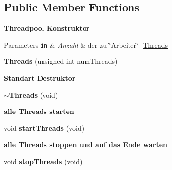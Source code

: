 \subsection*{Public Member Functions}
\begin{Indent}{\bf Threadpool Konstruktor}\par
{\em 
\begin{DoxyParams}[1]{Parameters}
\mbox{\tt in}  & {\em Anzahl} & der zu \char`\"{}\+Arbeiter\char`\"{}-\/ \hyperlink{classrc_1_1Threads}{Threads} \\
\hline
\end{DoxyParams}
}\begin{DoxyCompactItemize}
\item 
\hypertarget{classrc_1_1Threads_affe90c184a6b2df13bdeb7912b6aff5d}{{\bfseries Threads} (unsigned int num\+Threads)}\label{classrc_1_1Threads_affe90c184a6b2df13bdeb7912b6aff5d}

\end{DoxyCompactItemize}
\end{Indent}
\begin{Indent}{\bf Standart Destruktor}\par
\begin{DoxyCompactItemize}
\item 
\hypertarget{classrc_1_1Threads_ad82b89cce4b9a43dcf35fd0b45fc3da7}{{\bfseries $\sim$\+Threads} (void)}\label{classrc_1_1Threads_ad82b89cce4b9a43dcf35fd0b45fc3da7}

\end{DoxyCompactItemize}
\end{Indent}
\begin{Indent}{\bf alle Threads starten}\par
\begin{DoxyCompactItemize}
\item 
\hypertarget{classrc_1_1Threads_a4018457ff9184b13ed0ab7bcc8f2e266}{void {\bfseries start\+Threads} (void)}\label{classrc_1_1Threads_a4018457ff9184b13ed0ab7bcc8f2e266}

\end{DoxyCompactItemize}
\end{Indent}
\begin{Indent}{\bf alle Threads stoppen und auf das Ende warten}\par
\begin{DoxyCompactItemize}
\item 
\hypertarget{classrc_1_1Threads_a9c90d6f1859830190ef239d9969c9121}{void {\bfseries stop\+Threads} (void)}\label{classrc_1_1Threads_a9c90d6f1859830190ef239d9969c9121}

\end{DoxyCompactItemize}
\end{Indent}
